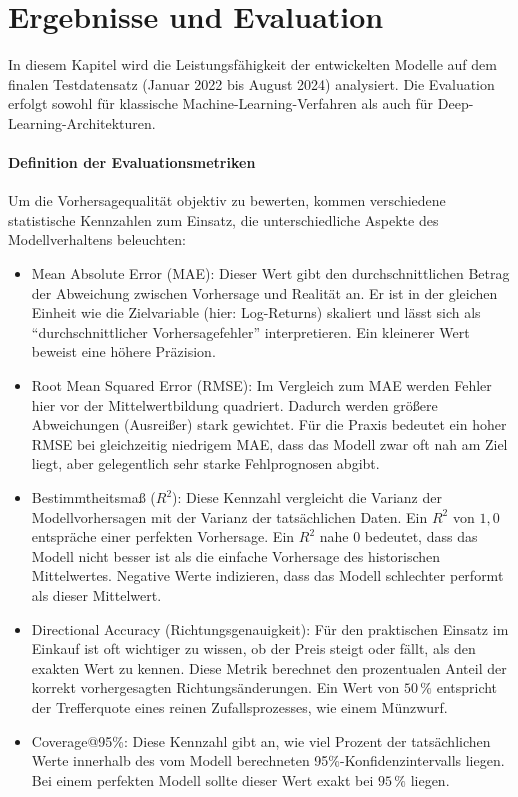 \section{Ergebnisse und Evaluation}
\label{sec:ergebnisse}

In diesem Kapitel wird die Leistungsfähigkeit der entwickelten Modelle auf dem finalen Testdatensatz (Januar 2022 bis August 2024) analysiert. Die Evaluation erfolgt sowohl für klassische Machine-Learning-Verfahren als auch für Deep-Learning-Architekturen.

\paragraph{Definition der Evaluationsmetriken}
Um die Vorhersagequalität objektiv zu bewerten, kommen verschiedene statistische Kennzahlen zum Einsatz, die unterschiedliche Aspekte des Modellverhaltens beleuchten:
\begin{itemize}
    \item Mean Absolute Error (MAE): Dieser Wert gibt den durchschnittlichen Betrag der Abweichung zwischen Vorhersage und Realität an. Er ist in der gleichen Einheit wie die Zielvariable (hier: Log-Returns) skaliert und lässt sich als "`durchschnittlicher Vorhersagefehler"' interpretieren. Ein kleinerer Wert beweist eine höhere Präzision.
    \item Root Mean Squared Error (RMSE): Im Vergleich zum MAE werden Fehler hier vor der Mittelwertbildung quadriert. Dadurch werden größere Abweichungen (Ausreißer) stark gewichtet. Für die Praxis bedeutet ein hoher RMSE bei gleichzeitig niedrigem MAE, dass das Modell zwar oft nah am Ziel liegt, aber gelegentlich sehr starke Fehlprognosen abgibt.
    \item Bestimmtheitsmaß ($R^2$): Diese Kennzahl vergleicht die Varianz der Modellvorhersagen mit der Varianz der tatsächlichen Daten. Ein $R^2$ von $1,0$ entspräche einer perfekten Vorhersage. Ein $R^2$ nahe $0$ bedeutet, dass das Modell nicht besser ist als die einfache Vorhersage des historischen Mittelwertes. Negative Werte indizieren, dass das Modell schlechter performt als dieser Mittelwert.
    \item Directional Accuracy (Richtungsgenauigkeit): Für den praktischen Einsatz im Einkauf ist oft wichtiger zu wissen, ob der Preis steigt oder fällt, als den exakten Wert zu kennen. Diese Metrik berechnet den prozentualen Anteil der korrekt vorhergesagten Richtungsänderungen. Ein Wert von $50\,\%$ entspricht der Trefferquote eines reinen Zufallsprozesses, wie einem Münzwurf.
    \item Coverage@95\%: Diese Kennzahl gibt an, wie viel Prozent der tatsächlichen Werte innerhalb des vom Modell berechneten 95\%-Konfidenzintervalls liegen. Bei einem perfekten Modell sollte dieser Wert exakt bei $95\,\%$ liegen.
\end{itemize}

